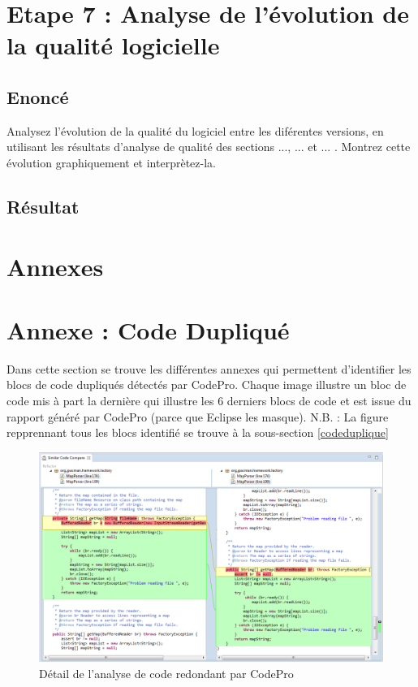 \documentclass[12pt,a4paper,final]{article}
\begin{document}
\section{Etape 7 : Analyse de l'évolution de la qualité logicielle}\label{sec:etape7}
\subsection{Enoncé} 
Analysez l'évolution de la qualité du logiciel entre les diférentes versions, en utilisant les résultats d'analyse de qualité des sections ..., ... et ... . Montrez cette évolution graphiquement et interprètez-la.
\subsection{Résultat}

\clearpage
\newpage
\section{Annexes} \label{sec:annexe}
\appendix %
\section{Annexe : Code Dupliqué}\label{SimilarCode}
Dans cette section se trouve les différentes annexes qui permettent d'identifier les blocs de code dupliqués détectés par CodePro. Chaque image illustre un bloc de code mis à part la dernière qui illustre les 6 derniers blocs de code et est issue du rapport généré par CodePro (parce que Eclipse les masque).
N.B. : La figure repprennant tous les blocs identifié se trouve à la sous-section \ref{codeduplique}

\begin{figure}[ht]
	\centering
	\includegraphics[width=\textwidth]{images/SimilarCode_1.png}
	\caption{\label{SimilarCode1}Détail de l'analyse de code redondant par CodePro}
\end{figure}
\end{document}
